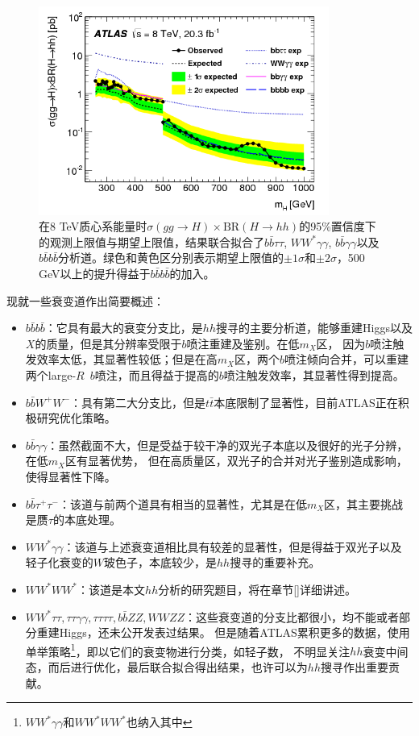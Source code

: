 \begin{figure}[h]
\centering
 \includegraphics[width=0.85\textwidth]{fig/HH_run1_combined.png}
\caption{在8 TeV质心系能量时$\sigma(gg\rightarrow H)\times\text{BR}(H\rightarrow hh)$的95\%置信度下的观测上限值与期望上限值，结果联合拟合了$b\bar{b}\tau\tau$, $WW^*\gamma\gamma$, $b\bar{b}\gamma\gamma$以及$b\bar{b}b\bar{b}$分析道。绿色和黄色区分别表示期望上限值的$\pm 1\sigma$和$\pm 2\sigma$，500 GeV以上的提升得益于$b\bar{b}b\bar{b}$的加入。}
\label{fig:HH_run1_combined}
\end{figure}

现就一些衰变道作出简要概述：
\begin{itemize}
 \item $b\bar{b}b\bar{b}$：它具有最大的衰变分支比，是$hh$搜寻的主要分析道，能够重建Higgs以及$X$的质量，但是其分辨率受限于$b$喷注重建及鉴别。在低$m_X$区，
 因为$b$喷注触发效率太低，其显著性较低；但是在高$m_X$区，两个$b$喷注倾向合并，可以重建两个large-$R$~$b$喷注，而且得益于提高的$b$喷注触发效率，其显著性得到提高。
 \item $b\bar{b}W^{+}W^{-}$：具有第二大分支比，但是$t\bar{t}$本底限制了显著性，目前ATLAS正在积极研究优化策略。
 \item $b\bar{b}\gamma\gamma$：虽然截面不大，但是受益于较干净的双光子本底以及很好的光子分辨，在低$m_X$区有显著优势，
 但在高质量区，双光子的合并对光子鉴别造成影响，使得显著性下降。
 \item $b\bar{b}\tau^{+}\tau^{-}$：该道与前两个道具有相当的显著性，尤其是在低$m_X$区，其主要挑战是赝$\tau$的本底处理。
 \item $WW^{*}\gamma\gamma$：该道与上述衰变道相比具有较差的显著性，但是得益于双光子以及轻子化衰变的$W$玻色子，本底较少，是$hh$搜寻的重要补充。
 \item $WW^{*}WW^{*}$：该道是本文$hh$分析的研究题目，将在章节\ref{}详细讲述。
 \item $WW^{*}\tau\tau, \tau\tau\gamma\gamma, \tau\tau\tau\tau, b\bar{b}ZZ, WWZZ$：这些衰变道的分支比都很小，均不能或者部分重建Higgs，还未公开发表过结果。
 但是随着ATLAS累积更多的数据，使用单举策略\footnote{$WW^{*}\gamma\gamma$和$WW^{*}WW^{*}$也纳入其中}，即以它们的衰变物进行分类，如轻子数，
 不明显关注$hh$衰变中间态，而后进行优化，最后联合拟合得出结果，也许可以为$hh$搜寻作出重要贡献。
\end{itemize}
